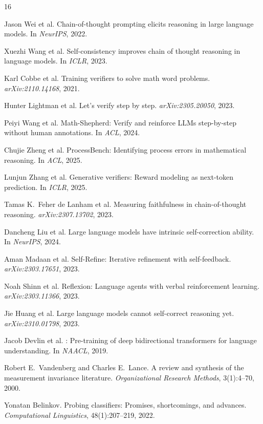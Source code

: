 \documentclass{article}
\begin{document}

\begin{thebibliography}{16}

Jason Wei et al.
\newblock Chain-of-thought prompting elicits reasoning in large language models.
\newblock In \emph{NeurIPS}, 2022.

Xuezhi Wang et al.
\newblock Self-consistency improves chain of thought reasoning in language models.
\newblock In \emph{ICLR}, 2023.

Karl Cobbe et al.
\newblock Training verifiers to solve math word problems.
\newblock \emph{arXiv:2110.14168}, 2021.

Hunter Lightman et al.
\newblock Let's verify step by step.
\newblock \emph{arXiv:2305.20050}, 2023.

Peiyi Wang et al.
\newblock Math-Shepherd: Verify and reinforce {LLM}s step-by-step without human annotations.
\newblock In \emph{ACL}, 2024.

Chujie Zheng et al.
\newblock ProcessBench: Identifying process errors in mathematical reasoning.
\newblock In \emph{ACL}, 2025.

Lunjun Zhang et al.
\newblock Generative verifiers: Reward modeling as next-token prediction.
\newblock In \emph{ICLR}, 2025.

Tamas K.\ Feher de Lanham et al.
\newblock Measuring faithfulness in chain-of-thought reasoning.
\newblock \emph{arXiv:2307.13702}, 2023.

Dancheng Liu et al.
\newblock Large language models have intrinsic self-correction ability.
\newblock In \emph{NeurIPS}, 2024.

Aman Madaan et al.
\newblock Self-Refine: Iterative refinement with self-feedback.
\newblock \emph{arXiv:2303.17651}, 2023.

Noah Shinn et al.
\newblock Reflexion: Language agents with verbal reinforcement learning.
\newblock \emph{arXiv:2303.11366}, 2023.

Jie Huang et al.
\newblock Large language models cannot self-correct reasoning yet.
\newblock \emph{arXiv:2310.01798}, 2023.

Jacob Devlin et al.
: Pre-training of deep bidirectional transformers for language understanding.
\newblock In \emph{NAACL}, 2019.

Robert E.\ Vandenberg and Charles E.\ Lance.
\newblock A review and synthesis of the measurement invariance literature.
\newblock \emph{Organizational Research Methods}, 3(1):4--70, 2000.

Yonatan Belinkov.
\newblock Probing classifiers: Promises, shortcomings, and advances.
\newblock \emph{Computational Linguistics}, 48(1):207--219, 2022.

\end{thebibliography}

\clearpage

\end{document}
